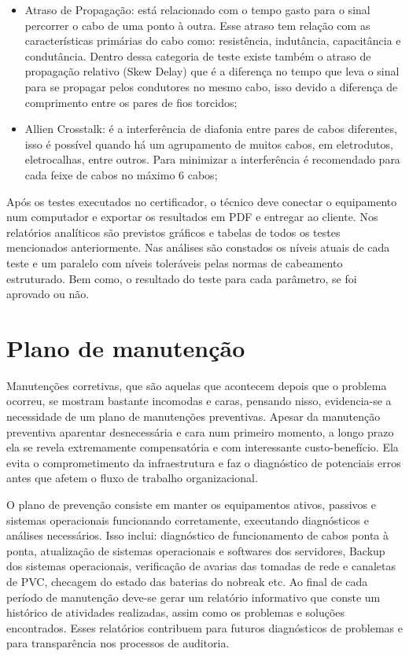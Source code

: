 \documentclass[	DIV=calc,%
							paper=a4,%
							fontsize=12pt,%
							onecolumn]{scrartcl}	 					%
\begin{document}
\begin{itemize}
	\item Atraso de Propagação: está relacionado com o tempo gasto para o sinal percorrer o cabo de uma ponto à outra. Esse atraso tem relação com as características primárias do cabo como: resistência, indutância, capacitância e condutância. Dentro dessa categoria de teste existe também o atraso de propagação relativo (Skew Delay) que é a diferença no tempo que leva o sinal para se propagar pelos condutores no mesmo cabo, isso devido a diferença de comprimento entre os pares de fios torcidos;
	\item Allien Crosstalk: é a interferência de diafonia entre pares de cabos diferentes, isso é possível quando há um agrupamento de muitos cabos, em eletrodutos, eletrocalhas, entre outros. Para minimizar a interferência é recomendado para cada feixe de cabos no máximo 6 cabos;
\end{itemize}

Após os testes executados no certificador, o técnico deve conectar o equipamento num computador e exportar os resultados em PDF e entregar ao cliente. Nos relatórios analíticos são previstos gráficos e tabelas de todos os testes mencionados anteriormente. Nas análises são constados os níveis atuais de cada teste e um paralelo com níveis toleráveis pelas normas de cabeamento estruturado. Bem como, o resultado do teste para cada parâmetro, se foi aprovado ou não.


\section{Plano de manutenção}

Manutenções corretivas, que são aquelas que acontecem depois que o problema ocorreu, se mostram bastante incomodas e caras, pensando nisso, evidencia-se a necessidade de um plano de manutenções preventivas. Apesar da manutenção preventiva aparentar desnecessária e cara num primeiro momento, a longo prazo ela se revela extremamente compensatória e com interessante custo-benefício. Ela evita o comprometimento da infraestrutura e faz o diagnóstico de potenciais erros antes que afetem o fluxo de trabalho organizacional.

O plano de prevenção consiste em manter os equipamentos ativos, passivos e sistemas operacionais funcionando corretamente, executando diagnósticos e análises necessários. Isso inclui: diagnóstico de funcionamento de cabos ponta à ponta, atualização de sistemas operacionais e softwares dos servidores, Backup dos sistemas operacionais, verificação de avarias das tomadas de rede e canaletas de PVC, checagem do estado das baterias do nobreak etc. Ao final de cada período de manutenção deve-se gerar um relatório informativo que conste um histórico de atividades realizadas, assim como os problemas e soluções encontrados. Esses relatórios contribuem para futuros diagnósticos de problemas e para transparência nos processos de auditoria.
\end{document}
